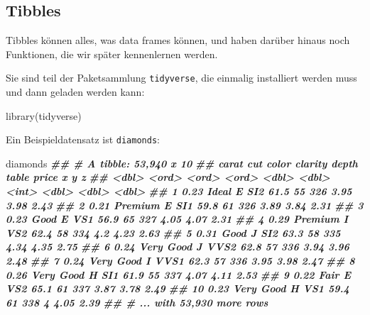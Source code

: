 \documentclass[
  ngerman,
]{article}
\newenvironment{Shaded}{\begin{snugshade}}{\end{snugshade}}
\newcommand{\DocumentationTok}[1]{\textcolor[rgb]{0.56,0.35,0.01}{\textbf{\textit{#1}}}}
\newcommand{\FunctionTok}[1]{\textcolor[rgb]{0.00,0.00,0.00}{#1}}
\newcommand{\NormalTok}[1]{#1}
\begin{document}
\hypertarget{tibbles}{%
\subsection{Tibbles}\label{tibbles}}

Tibbles können alles, was data frames können, und haben darüber hinaus noch Funktionen, die wir später kennenlernen werden.

Sie sind teil der Paketsammlung \texttt{tidyverse}, die einmalig installiert werden muss und dann geladen werden kann:

\begin{Shaded}
\begin{Highlighting}[]
\FunctionTok{library}\NormalTok{(tidyverse)}
\end{Highlighting}
\end{Shaded}

Ein Beispieldatensatz ist \texttt{diamonds}:

\begin{Shaded}
\begin{Highlighting}[]
\NormalTok{diamonds}
\DocumentationTok{\#\# \# A tibble: 53,940 x 10}
\DocumentationTok{\#\#    carat cut       color clarity depth table price     x     y     z}
\DocumentationTok{\#\#    \textless{}dbl\textgreater{} \textless{}ord\textgreater{}     \textless{}ord\textgreater{} \textless{}ord\textgreater{}   \textless{}dbl\textgreater{} \textless{}dbl\textgreater{} \textless{}int\textgreater{} \textless{}dbl\textgreater{} \textless{}dbl\textgreater{} \textless{}dbl\textgreater{}}
\DocumentationTok{\#\#  1  0.23 Ideal     E     SI2      61.5    55   326  3.95  3.98  2.43}
\DocumentationTok{\#\#  2  0.21 Premium   E     SI1      59.8    61   326  3.89  3.84  2.31}
\DocumentationTok{\#\#  3  0.23 Good      E     VS1      56.9    65   327  4.05  4.07  2.31}
\DocumentationTok{\#\#  4  0.29 Premium   I     VS2      62.4    58   334  4.2   4.23  2.63}
\DocumentationTok{\#\#  5  0.31 Good      J     SI2      63.3    58   335  4.34  4.35  2.75}
\DocumentationTok{\#\#  6  0.24 Very Good J     VVS2     62.8    57   336  3.94  3.96  2.48}
\DocumentationTok{\#\#  7  0.24 Very Good I     VVS1     62.3    57   336  3.95  3.98  2.47}
\DocumentationTok{\#\#  8  0.26 Very Good H     SI1      61.9    55   337  4.07  4.11  2.53}
\DocumentationTok{\#\#  9  0.22 Fair      E     VS2      65.1    61   337  3.87  3.78  2.49}
\DocumentationTok{\#\# 10  0.23 Very Good H     VS1      59.4    61   338  4     4.05  2.39}
\DocumentationTok{\#\# \# ... with 53,930 more rows}
\end{Highlighting}
\end{Shaded}
\end{document}
